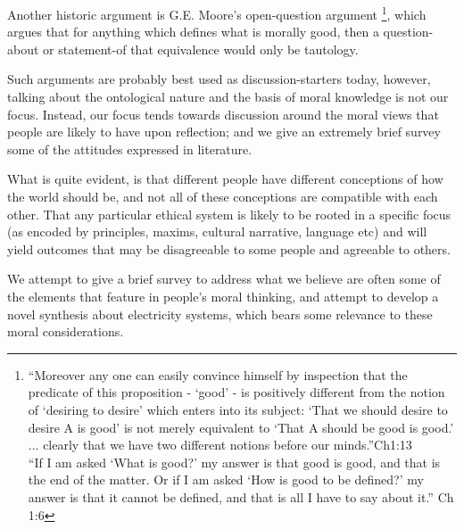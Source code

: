 Another historic argument is G.E. Moore's open-question argument \cite{MooreGutenberg}\footnote{
``Moreover any one can easily convince himself by inspection that the predicate of this proposition - `good' - is positively different from the notion of `desiring to desire' which enters into its subject: `That we should desire to desire A is good' is not merely equivalent to `That A should be good is good.' ... clearly that we have two different notions before our minds.''Ch1:13\\
``If I am asked `What is good?' my answer is that good is good, and that is the end of the matter. Or if I am asked `How is good to be defined?' my answer is that it cannot be defined, and that is all I have to say about it.'' Ch 1:6}, which argues that for anything which defines what is morally good, then a question-about or statement-of that equivalence would only be tautology.

Such arguments are probably best used as discussion-starters today, however, talking about the ontological nature and the basis of moral knowledge is not our focus.
Instead, our focus tends towards discussion around the moral views that people are likely to have upon reflection; and we give an extremely brief survey some of the attitudes expressed in literature.

What is quite evident, is that different people have different conceptions of how the world should be, and not all of these conceptions are compatible with each other.
That any particular ethical system is likely to be rooted in a specific focus (as encoded by principles, maxims, cultural narrative, language etc) and will yield outcomes that may be disagreeable to some people and agreeable to others.


We attempt to give a brief survey to address what we believe are often some of the elements that feature in people's moral thinking, and attempt to develop a novel synthesis about electricity systems, which bears some relevance to these moral considerations.

